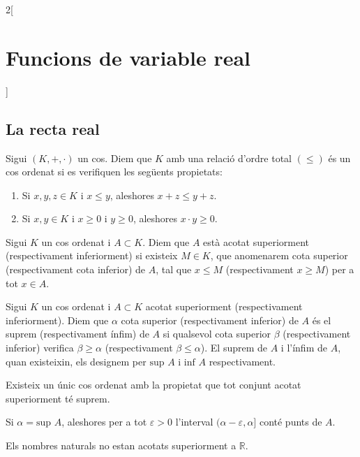 \documentclass[class=article,10pt,crop=false]{standalone}
\begin{document}
\begin{multicols}{2}[\section{Funcions de variable real}]
\subsection{La recta real}
\begin{definition}
Sigui $(K,+,\cdot)$ un cos. Diem que $K$ amb una relació d'ordre total $(\leq)$ és un cos ordenat si es verifiquen les següents propietats:
\begin{enumerate}
    \item Si $x,y,z\in K$ i $x\leq y$, aleshores $x+z\leq y+z$.
    \item Si $x,y\in K$ i $x\geq0$ i $y\geq0$, aleshores $x\cdot y\geq 0$.
\end{enumerate}
\end{definition}
\begin{definition}
Sigui $K$ un cos ordenat i $A\subset K$. Diem que $A$ està acotat superiorment
(respectivament inferiorment) si existeix $M\in K$, que anomenarem cota superior (respectivament cota inferior) de $A$, tal que $x\leq M$ (respectivament $x\geq M$) per a tot $x\in A$.
\end{definition}
\begin{definition}
Sigui $K$ un cos ordenat i $A\subset K$ acotat superiorment (respectivament inferiorment). Diem que $\alpha$ cota superior (respectivament inferior) de $A$ és el suprem (respectivament ínfim) de $A$ si qualsevol cota superior $\beta$ (respectivament inferior) verifica $\beta\geq\alpha$ (respectivament $\beta\leq\alpha$). El suprem de $A$ i l'ínfim de $A$, quan existeixin, els designem per $\text{sup }A$ i $\text{inf }A$ respectivament.
\end{definition}
\begin{theorem}
Existeix un únic cos ordenat amb la propietat que tot conjunt acotat
superiorment té suprem.
\end{theorem}
\begin{lemma}
Si $\alpha=\text{sup }A$, aleshores per a tot $\varepsilon>0$ l'interval $(\alpha-\varepsilon,\alpha]$ conté punts de $A$.
\end{lemma}
\begin{prop}
Els nombres naturals no estan acotats superiorment a $\mathbb{R}$.
\end{prop}
\begin{prop}

\end{prop}
\end{multicols}
\end{document}
